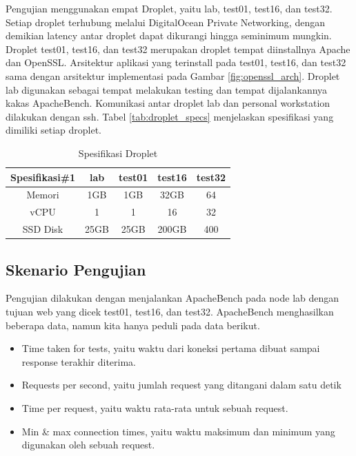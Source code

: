 Pengujian menggunakan empat Droplet, yaitu lab, test01, test16, dan test32. Setiap droplet terhubung melalui DigitalOcean Private Networking, dengan demikian latency antar droplet dapat dikurangi hingga seminimum mungkin. Droplet test01, test16, dan test32 merupakan droplet tempat diinstallnya Apache dan OpenSSL. Arsitektur aplikasi yang terinstall pada test01, test16, dan test32 sama dengan arsitektur implementasi pada Gambar \ref{fig:openssl_arch}. Droplet lab digunakan sebagai tempat melakukan testing dan tempat dijalankannya kakas ApacheBench. Komunikasi antar droplet lab dan personal workstation dilakukan dengan ssh. Tabel \ref{tab:droplet_specs} menjelaskan spesifikasi yang dimiliki setiap droplet.

\begin{table}[ht]
\caption{Spesifikasi Droplet} %
\label{tab:droplet_specs}
\centering %
\begin{tabular}{|| c | c c c c ||} %
\hline\hline %
Spesifikasi\#1 & lab & test01 & test16 & test32\\[0.5ex] %
\hline %
Memori    & 1GB   & 1GB   & 32GB  & 64 \\
vCPU      & 1     & 1     & 16    & 32 \\
SSD Disk  & 25GB  & 25GB  & 200GB & 400 \\ [1ex] %
\hline\hline %
\end{tabular}
\label{table:nonlin} %
\end{table}

\subsection{Skenario Pengujian}
Pengujian dilakukan dengan menjalankan ApacheBench pada node lab dengan tujuan web yang dicek test01, test16, dan test32. ApacheBench menghasilkan beberapa data, namun kita hanya peduli pada data berikut. 
\begin{itemize}
  \item Time taken for tests, yaitu waktu dari koneksi pertama dibuat sampai response terakhir diterima.
  \item Requests per second, yaitu jumlah request yang ditangani dalam satu detik
  \item Time per request, yaitu waktu rata-rata untuk sebuah request.
  \item Min \& max connection times, yaitu waktu maksimum dan minimum yang digunakan oleh sebuah request.
\end{itemize}

